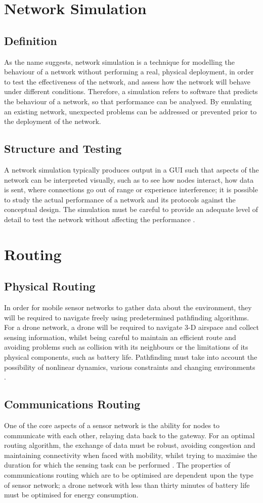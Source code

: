 	\section{Network Simulation}
		\subsection{Definition}
		As the name suggests, network simulation is a technique for modelling the behaviour of a network without performing a real, physical deployment, in order to test the effectiveness of the network, and assess how the network will behave under different conditions. Therefore, a simulation refers to software that predicts the behaviour of a network, so that performance can be analysed. By emulating an existing network, unexpected problems can be addressed or prevented prior to the deployment of the network.
		\subsection{Structure and Testing}
		A network simulation typically produces output in a GUI such that aspects of the network can be interpreted visually, such as to see how nodes interact, how data is sent, where connections go out of range or experience interference; it is possible to study the actual performance of a network and its protocols against the conceptual design. The simulation must be careful to provide an adequate level of detail to test the network without affecting the performance \cite{ leebreslauetal2000}. 
	\section{Routing}
		\subsection{Physical Routing}
		In order for mobile sensor networks to gather data about the environment, they will be required to navigate freely using predetermined pathfinding algorithms. For a drone network, a drone will be required to navigate 3-D airspace and collect sensing information, whilst being careful to maintain an efficient route and avoiding problems such as collision with its neighbours or the limitations of its physical components, such as battery life. Pathfinding must take into account the possibility of nonlinear dynamics, various constraints and changing environments \cite{robertsivillietal2012}.
		\subsection{Communications Routing}
		One of the core aspects of a sensor network is the ability for nodes to communicate with each other, relaying data back to the gateway. For an optimal routing algorithm, the exchange of data must be robust, avoiding congestion and maintaining connectivity when faced with mobility, whilst trying to maximise the duration for which the sensing task can be performed \cite{ curtschurgers2010}. The properties of communications routing which are to be optimised are dependent upon the type of sensor network; a drone network with less than thirty minutes of battery life must be optimised for energy consumption.